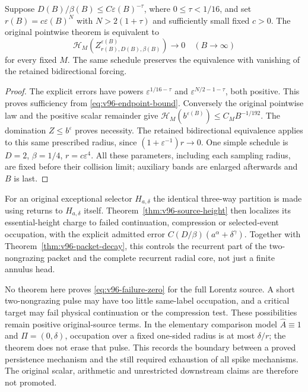 \begin{corollary}
\label{cor:v96-schedule}
Suppose $D(B)/\beta(B)\le C\varepsilon(B)^{-\tau}$, where
$0\le\tau<1/16$, and set $r(B)=c\varepsilon(B)^N$ with
$N>2(1+\tau)$ and sufficiently small fixed $c>0$. The original
pointwise theorem is equivalent to
\begin{equation}\label{eq:v96-failure-zero}
 \mathcal H_M(Z_{r(B),D(B),\beta(B)}^{\varepsilon(B)})
                           \longrightarrow0\quad(B\to\infty)
\end{equation}
for every fixed $M$. The same schedule preserves the equivalence
with vanishing of the retained bidirectional forcing.
\end{corollary}
\begin{proof}
The explicit errors have powers $\varepsilon^{1/16-\tau}$ and
$\varepsilon^{N/2-1-\tau}$, both positive. This proves sufficiency
from \eqref{eq:v96-endpoint-bound}. Conversely the original
pointwise law and the positive scalar remainder give
$\mathcal H_M(b^{\varepsilon(B)})\le C_MB^{-1/192}$.
The domination $Z\le b^\varepsilon$ proves necessity. The retained
bidirectional equivalence applies to this same prescribed radius,
since $(1+\varepsilon^{-1})r\to0$. One simple schedule is
$D=2$, $\beta=1/4$, $r=c\varepsilon^4$. All these parameters,
including each sampling radius, are fixed before their collision
limit; auxiliary bands are enlarged afterwards and $B$ is last.
\end{proof}

For an original exceptional selector $H_{a,\delta}$ the identical
three-way partition is made using returns to $H_{a,\delta}$ itself.
Theorem~\ref{thm:v96-source-height} then localizes its essential-height
charge to failed continuation, compression or selected-event occupation,
with the explicit admitted error $C(D/\beta)(a^\alpha+\delta^\gamma)$.
Together with Theorem~\ref{thm:v96-packet-decay}, this controls the
recurrent part of the two-nongrazing packet and the complete recurrent
radial core, not just a finite annulus head.

No theorem here proves \eqref{eq:v96-failure-zero} for the full
Lorentz source. A short two-nongrazing pulse may have too little
same-label occupation, and a critical target may fail physical
continuation or the compression test. These possibilities remain
positive original-source terms. In the elementary comparison model
$\widehat A\equiv1$ and $\Pi=(0,\delta)$, occupation over a fixed
one-sided radius is at most $\delta/r$; the theorem does not erase
that pulse. This records the boundary between a proved persistence
mechanism and the still required exhaustion of all spike mechanisms.
The original scalar, arithmetic and unrestricted downstream claims
are therefore not promoted.

